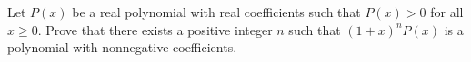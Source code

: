 Let $P(x)$ be a real polynomial with real coefficients such that $P(x) > 0$ for all $x \geq 0$. Prove that there exists a positive integer $n$ such that $(1+x)^n P(x)$ is a polynomial with nonnegative coefficients.
